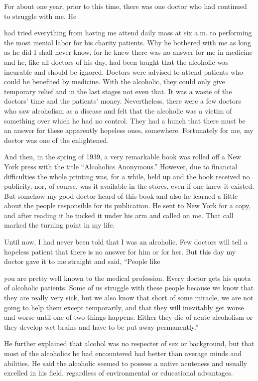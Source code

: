 \begin{biblechapter}
For about one year, prior to this time, there was one doctor who had continued to struggle with me. He

had tried everything from having me attend daily mass at six a.m. to performing the most menial labor for his charity patients. Why he bothered with me as long as he did I shall never know, for he knew there was no answer for me in medicine and he, like all doctors of his day, had been taught that the alcoholic was incurable and should be ignored. Doctors were advised to attend patients who could be benefited by medicine. With the alcoholic, they could only give temporary relief and in the last stages not even that. It was a waste of the doctors’ time and the patients’ money. Nevertheless, there were a few doctors who saw alcoholism as a disease and felt that the alcoholic was a victim of something over which he had no control. They had a hunch that there must be an answer for these apparently hopeless ones, somewhere. Fortunately for me, my doctor was one of the enlightened.

And then, in the spring of 1939, a very remarkable book was rolled off a New York press with the title “Alcoholics Anonymous.” However, due to financial difficulties the whole printing was, for a while, held up and the book received no publicity, nor, of course, was it available in the stores, even if one knew it existed. But somehow my good doctor heard of this book and also he learned a little about the people responsible for its publication. He sent to New York for a copy, and after reading it he tucked it under his arm and called on me. That call marked the turning point in my life.

Until now, I had never been told that I was an alcoholic. Few doctors will tell a hopeless patient that there is no answer for him or for her. But this day my doctor gave it to me straight and said, “People like

you are pretty well known to the medical profession. Every doctor gets his quota of alcoholic patients. Some of us struggle with these people because we know that they are really very sick, but we also know that short of some miracle, we are not going to help them except temporarily, and that they will inevitably get worse and worse until one of two things happens. Either they die of acute alcoholism or they develop wet brains and have to be put away permanently.”

He further explained that alcohol was no respecter of sex or background, but that most of the alcoholics he had encountered had better than average minds and abilities. He said the alcoholic seemed to possess a native acuteness and usually excelled in his field, regardless of environmental or educational advantages.


\end{biblechapter}

